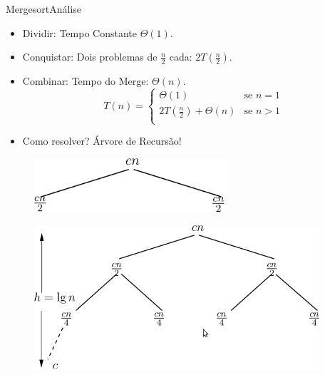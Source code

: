 \documentclass[aspectratio=169]{beamer}
\begin{document}

\begin{frame}{Mergesort}{Análise}
\begin{itemize}
\item Dividir: Tempo Constante $\Theta(1)$.
\item Conquistar: Dois problemas de $\frac{n}{2}$ cada: $2T(\frac{n}{2})$.
\item Combinar: Tempo do Merge: $\Theta(n)$.
\begin{equation*}
    T(n) = \begin{cases}
               \Theta(1)                      & \textrm{se } n = 1\\
               2T(\frac{n}{2}) +\Theta(n)  & \textrm{se } n > 1 \\
           \end{cases}
\end{equation*}
\item Como resolver? Árvore de Recursão!
\end{itemize}
\end{frame}


\begin{frame}
\begin{figure}[!h]
  \centering
  \includegraphics[width=200pt]{imgs/arvore_mergesort.png}
  \label{fig_arvore_mergesort}
\end{figure}
\end{frame}


\begin{frame}
\begin{figure}[!h]
  \centering
  \includegraphics[width=300pt]{imgs/arvore_mergesort1.png}
  \label{fig_arvore_mergesort1}
\end{figure}
\end{frame}
\end{document}
